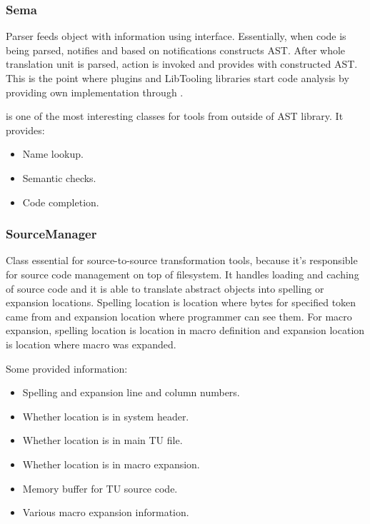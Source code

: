\subsubsection{Sema}
Parser feeds  object with information using  interface. Essentially, when code is being parsed,  notifies  and based on notifications  constructs AST. After whole translation unit is parsed,  action is invoked and  provides  with constructed AST. This is the point where plugins and LibTooling libraries start code analysis by providing own  implementation through .

 is one of the most interesting classes for tools from outside of AST library. It provides:

\begin{itemize}
\item Name lookup.
\item Semantic checks.
\item Code completion.
\end{itemize}

\subsubsection{SourceManager}
Class essential for source-to-source transformation tools, because it's responsible for source code management on top of filesystem. It handles loading and caching of source code and it is able to translate abstract  objects into spelling or expansion locations. Spelling location is location where bytes for specified token came from and expansion location where programmer can see them. For macro expansion, spelling location is location in macro definition and expansion location is location where macro was expanded.

Some provided information:

\begin{itemize}
\item Spelling and expansion line and column numbers.
\item Whether location is in system header.
\item Whether location is in main TU file.
\item Whether location is in macro expansion.
\item Memory buffer for TU source code.
\item Various macro expansion information.
\end{itemize}

